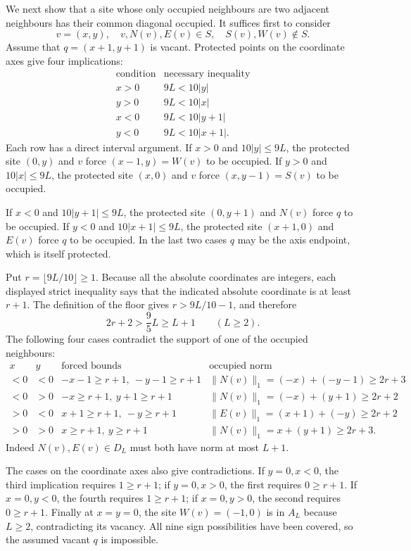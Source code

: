 \documentclass[
  11pt,
  a4paper,
]{article}
\begin{document}
We next show that a site whose only occupied neighbours are two adjacent
neighbours has their common diagonal occupied. It suffices first to
consider \[
v=(x,y),\quad v,N(v),E(v)\in S,\quad
S(v),W(v)\notin S.
\] Assume that \(q=(x+1,y+1)\) is vacant. Protected points on the
coordinate axes give four implications: \[
\begin{array}{c|c}
\text{condition}&\text{necessary inequality}\\ \hline
x>0&9L<10|y|\\
y>0&9L<10|x|\\
x<0&9L<10|y+1|\\
y<0&9L<10|x+1|.
\end{array}
\] Each row has a direct interval argument. If \(x>0\) and
\(10|y|\le9L\), the protected site \((0,y)\) and \(v\) force
\((x-1,y)=W(v)\) to be occupied. If \(y>0\) and \(10|x|\le9L\), the
protected site \((x,0)\) and \(v\) force \((x,y-1)=S(v)\) to be
occupied.

If \(x<0\) and \(10|y+1|\le9L\), the protected site \((0,y+1)\) and
\(N(v)\) force \(q\) to be occupied. If \(y<0\) and \(10|x+1|\le9L\),
the protected site \((x+1,0)\) and \(E(v)\) force \(q\) to be occupied.
In the last two cases \(q\) may be the axis endpoint, which is itself
protected.

Put \(r=\lfloor9L/10\rfloor\ge1\). Because all the absolute coordinates
are integers, each displayed strict inequality says that the indicated
absolute coordinate is at least \(r+1\). The definition of the floor
gives \(r>9L/10-1\), and therefore \[
2r+2>\frac95 L\ge L+1\qquad(L\ge2).
\] The following four cases contradict the support of one of the
occupied neighbours: \[
\begin{array}{c|c|c|c}
x&y&\text{forced bounds}&\text{occupied norm}\\ \hline
<0&<0&
-x-1\ge r+1,\ -y-1\ge r+1&
\|N(v)\|_1=(-x)+(-y-1)\ge2r+3\\
<0&>0&
-x\ge r+1,\ y+1\ge r+1&
\|N(v)\|_1=(-x)+(y+1)\ge2r+2\\
>0&<0&
x+1\ge r+1,\ -y\ge r+1&
\|E(v)\|_1=(x+1)+(-y)\ge2r+2\\
>0&>0&
x\ge r+1,\ y\ge r+1&
\|N(v)\|_1=x+(y+1)\ge2r+3 .
\end{array}
\] Indeed \(N(v),E(v)\in D_L\) must both have norm at most \(L+1\).

The cases on the coordinate axes also give contradictions. If
\(y=0,x<0\), the third implication requires \(1\ge r+1\); if
\(y=0,x>0\), the first requires \(0\ge r+1\). If \(x=0,y<0\), the fourth
requires \(1\ge r+1\); if \(x=0,y>0\), the second requires \(0\ge r+1\).
Finally at \(x=y=0\), the site \(W(v)=(-1,0)\) is in \(A_L\) because
\(L\ge2\), contradicting its vacancy. All nine sign possibilities have
been covered, so the assumed vacant \(q\) is impossible.
\end{document}
